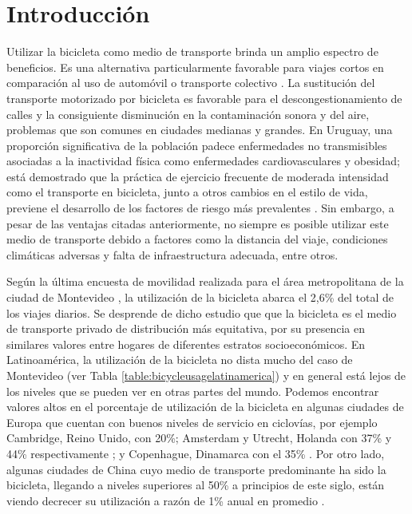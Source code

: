 \chapter{Introducción}

  Utilizar la bicicleta como medio de transporte brinda un amplio espectro de beneficios. Es una alternativa particularmente favorable para viajes cortos en comparación al uso de automóvil o transporte colectivo \parencite{Hull2014}. La sustitución del transporte motorizado por bicicleta es favorable para el descongestionamiento de calles y la consiguiente disminución en la contaminación sonora y del aire, problemas que son comunes en ciudades medianas y grandes. En Uruguay, una proporción significativa de la población padece enfermedades no transmisibles asociadas a la inactividad física como enfermedades cardiovasculares y obesidad; está demostrado que la práctica de ejercicio frecuente de moderada intensidad como el transporte en bicicleta, junto a otros cambios en el estilo de vida, previene el desarrollo de los factores de riesgo más prevalentes \parencite{heartrisksuy, mspphisicalactivityguid, mspsurveyriskfactors}. Sin embargo, a pesar de las ventajas citadas anteriormente, no siempre es posible utilizar este medio de transporte debido a factores como la distancia del viaje, condiciones climáticas adversas y falta de infraestructura adecuada, entre otros.

  Según la última encuesta de movilidad realizada para el área metropolitana de la ciudad de Montevideo \parencite{Mauttone2017a}, la utilización de la bicicleta abarca el 2,6\% del total de los viajes diarios. Se desprende de dicho estudio que que la bicicleta es el medio de transporte privado de distribución más equitativa, por su presencia en similares valores entre hogares de diferentes estratos socioeconómicos. En Latinoamérica, la utilización de la bicicleta no dista mucho del caso de Montevideo (ver Tabla \ref{table:bicycleusagelatinamerica}) y en general está lejos de los niveles que se pueden ver en otras partes del mundo. Podemos encontrar valores altos en el porcentaje de utilización de la bicicleta en algunas ciudades de Europa que cuentan con buenos niveles de servicio en ciclovías, por ejemplo Cambridge, Reino Unido, con 20\%; Amsterdam y Utrecht, Holanda con 37\% y 44\% respectivamente \parencite{Hull2014}; y Copenhague, Dinamarca con el 35\% \parencite{Vedel2017}. Por otro lado, algunas ciudades de China cuyo medio de transporte predominante ha sido la bicicleta, llegando a niveles superiores al 50\% a principios de este siglo, están viendo decrecer su utilización a razón de 1\% anual en promedio \parencite{Li2017}.

